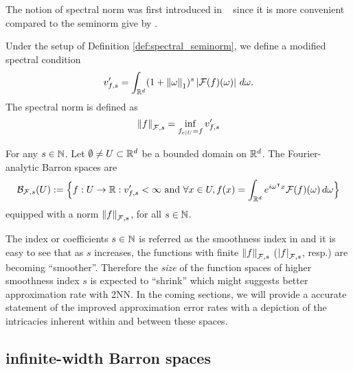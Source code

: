 The notion of spectral norm was first introduced in
~\cite{siegelApproximationRatesNeural2021} since it is more convenient compared
to the seminorm give by \cite{barronUniversalApproximationBounds1993}.



\begin{definition}
    \label{def:spectral_norm}
    Under the setup of Definition \ref{def:spectral_seminorm}, we define a
    modified spectral condition
    \begin{equation}
        \label{eq:spectral_condition_mod}
        v'_{f,s} 
            = \int_{\mathbb{R}^d} (1 + \left\| \omega \right\|_1)^s \left| \mathcal{F}(f)(\omega) \right|
            \,d\omega.
    \end{equation}
    The spectral norm is defined as
    \begin{equation}
        \left\| f \right\|_{\mathcal{F}, {s}} = \inf_{f_{e\mid U} = f} v'_{f,s}
    \end{equation}
\end{definition}

\begin{definition}
    \label{def:fourier_space}
    For any $s \in \mathbb{N}$. Let $\emptyset \not= U \subset \mathbb{R}^d$ be a bounded
    domain on $\mathbb{R}^d$. The Fourier-analytic Barron spaces are
    \begin{equation}
        \mathcal{B}_{\mathcal{F},s}(U) := \Big\{
            f: U \to \mathbb{R}: v'_{f,s} < \infty  \textnormal{ and }
            \forall x\in U, 
                f(x) = \int_{\mathbb{R}^d} e^{i\omega{}^{\intercal} x} \mathcal{F}(f)(\omega)\,d\omega
        \Big\}
    \end{equation}
    equipped with a norm $\left\| f \right\|_{\mathcal{F}, {s}}$, for all $s \in \mathbb{N}$.
\end{definition}

The index or coefficients $s \in \mathbb{N}$ is referred as the smoothness index in
\cite{siegelHighOrderApproximationRates2021} and it is easy to see that as $s$
increases, the functions with finite $\left\| f \right\|_{\mathcal{F}, {s}}$ ($\left| f \right|_{\mathcal{F}, {s}}$,
resp.) are becoming ``smoother''. Therefore the \textit{size} of the function
spaces of higher smoothness index $s$ is expected to ``shrink'' which might
suggests better approximation rate with 2NN. In the coming sections, we will
provide a accurate statement of the improved approximation error rates with a
depiction of the intricacies inherent within and between these spaces.


\subsection{infinite-width Barron spaces}
\label{sec:barron_norm}

